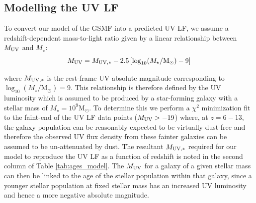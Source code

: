 \documentclass[fleqn,usenatbib]{mnras}
\begin{document}
\subsection{Modelling the UV LF}
To convert our model of the GSMF into a predicted UV LF, we assume a redshift-dependent mass-to-light ratio given by a linear relationship between $M_{\rm UV}$ and $M_{\star}$:
\begin{equation}
    M_{\rm UV} = M_{\rm UV, *} -2.5 \left[\log_{10}(M_{\star} / \mathrm{M_{\odot}}) - 9 \right]
\end{equation}

\noindent
where $M_{\rm UV, *}$ is the rest-frame UV absolute magnitude corresponding to $\log_{10}(M_{\star} / \mathrm{M_{\odot}})=9$. This relationship is therefore defined by the UV luminosity which is assumed to be produced by a star-forming galaxy with a stellar mass of $M_{\star} = 10^9  \mathrm{M_{\odot}}$. To determine this we perform a $\chi^2$ minimization fit to the faint-end of the UV LF data points ($M_{\rm UV}>-19$) where, at $z=6-13$, the galaxy population can be reasonably expected to be virtually dust-free and therefore the observed UV flux density from these fainter galaxies can be assumed to be un-attenuated by dust. The resultant $M_{\rm UV, *}$ required for our model to reproduce the UV LF as a function of redshift is noted in the second column of Table \ref{tab:ages_model}. The $M_{\rm UV}$ for a galaxy of a given stellar mass can then be linked to the age of the stellar population within that galaxy, since a younger stellar population at fixed stellar mass has an increased UV luminosity and hence a more negative absolute magnitude. 
\end{document}
